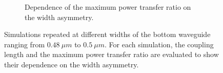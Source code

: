 \begin{figure}[H]
\begin{subfigure}[b]{0.48\linewidth}
        \caption{Dependence of the maximum power transfer ratio on the width asymmetry.}
        \label{fig:wg_power_vs_asymm}
    \end{subfigure}
    \caption{Simulations repeated at different widths of the bottom waveguide ranging from \(0.48\ \mu m\) to \(0.5\ \mu m\). For each simulation, the coupling length and the maximum power transfer ratio are evaluated to show their dependence on the width asymmetry.}
\end{figure}